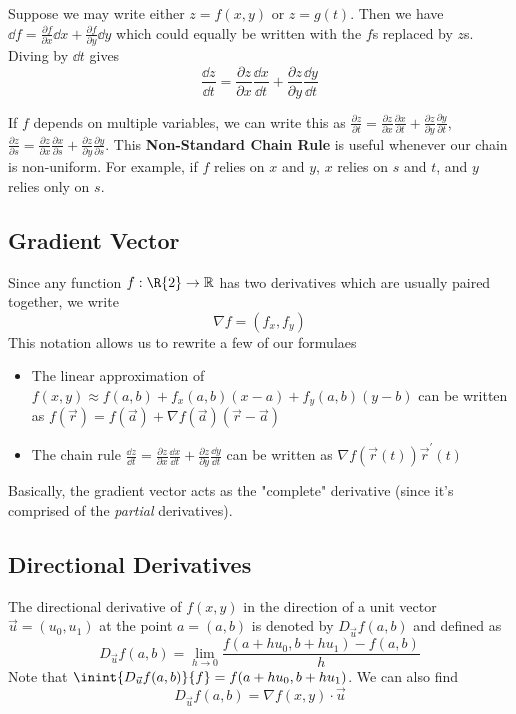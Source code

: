 \documentclass[12pt]{article}
\begin{document}
Suppose we may write either $z = f(x,y)$ or $z = g(t)$. Then we have $\dd f = \frac{\partial f}{\partial x} \dd x + \frac{\partial f}{\partial y} \dd y$ which could equally be written with the $f$s replaced by $z$s. Diving by $\dd t$ gives \[ \frac{\dd z}{\dd t} = \frac{\partial z}{\partial x} \frac{\dd x}{\dd t} + \frac{\partial z}{\partial y} \frac{\dd y}{\dd t} \]

If $f$ depends on multiple variables, we can write this as $\frac{\partial z}{\partial t} = \frac{\partial z}{\partial x} \frac{\partial x}{\partial t} + \frac{\partial z}{\partial y} \frac{\partial y}{\partial t}$, $\frac{\partial z}{\partial s} = \frac{\partial z}{\partial x} \frac{\partial x}{\partial s} + \frac{\partial z}{\partial y} \frac{\partial y}{\partial s}$. This {\bf Non-Standard Chain Rule} is useful whenever our chain is non-uniform. For example, if $f$ relies on $x$ and $y$, $x$ relies on $s$ and $t$, and $y$ relies only on $s$.

\subsection*{Gradient Vector}
Since any function $f: \R{2} \to \mathbb{R}$ has two derivatives which are usually paired together, we write \[ \nabla f = (f_x, f_y) \] This notation allows us to rewrite a few of our formulaes
\begin{itemize}
\item The linear approximation of $f(x,y) \approx f(a,b) + f_x(a,b)(x-a) + f_y(a,b)(y-b)$ can be written as $f(\vec{r}) = f(\vec{a}) + \nabla f(\vec{a})(\vec{r} - \vec{a})$
\item The chain rule $\frac{\dd z}{\dd t} = \frac{\partial z}{\partial x} \frac{\dd x}{\dd t} + \frac{\partial z}{\partial y} \frac{\dd y}{\dd t}$ can be written as $\nabla f(\vec{r}(t)) \vec{r}^\prime (t)$
\end{itemize}

Basically, the gradient vector acts as the "complete" derivative (since it's comprised of the \emph{partial} derivatives).

\subsection*{Directional Derivatives}
 The directional derivative of $f(x,y)$ in the direction of a unit vector $\vec{u} = (u_0, u_1)$ at the point $a = (a,b)$ is denoted by $D_{\vec{u}} f(a,b)$ and defined as \[ D_{\vec{u}} f(a,b) = \lim_{h\to 0} \frac{f(a + hu_0, b + hu_1) - f(a,b)}{h} \] Note that $\inint{D_{\vec{u}} f(a,b)}{f} = f(a + hu_0, b + hu_1)$. We can also find \[ D_{\vec{u}} f(a,b) = \nabla f(x,y) \cdot \vec{u} \]
\end{document}
